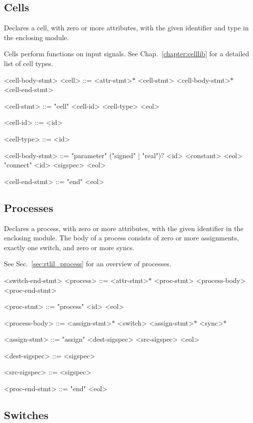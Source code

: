 \subsection{Cells}

Declares a cell, with zero or more attributes, with the given identifier and type in the enclosing module. 

Cells perform functions on input signals. See Chap.~\ref{chapter:celllib} for a detailed list of cell types.

\begin{indentgrammar}{<cell-body-stmt>}
<cell> ::= <attr-stmt>$*$ <cell-stmt> <cell-body-stmt>$*$ <cell-end-stmt>

<cell-stmt> ::= "cell" <cell-id> <cell-type> <eol>

<cell-id> ::= <id>

<cell-type> ::= <id>

<cell-body-stmt> ::= 
"parameter" ("signed" | "real")$?$ <id> <constant> <eol>
  \alt "connect" <id> <sigspec> <eol>

<cell-end-stmt> ::= "end" <eol>
\end{indentgrammar}

\subsection{Processes}

Declares a process, with zero or more attributes, with the given identifier in the enclosing module. The body of a process consists of zero or more assignments, exactly one switch, and zero or more syncs.

See Sec.~\ref{sec:rtlil_process} for an overview of processes.

\begin{indentgrammar}{<switch-end-stmt>}
<process> ::= <attr-stmt>$*$ <proc-stmt> <process-body> <proc-end-stmt>

<proc-stmt> ::= "process" <id> <eol>

<process-body> ::= <assign-stmt>$*$ <switch> <assign-stmt>$*$ <sync>$*$

<assign-stmt> ::= "assign" <dest-sigspec> <src-sigspec> <eol>

<dest-sigspec> ::= <sigspec>

<src-sigspec> ::= <sigspec>

<proc-end-stmt> ::= "end" <eol>

\end{indentgrammar}

\subsection{Switches}

